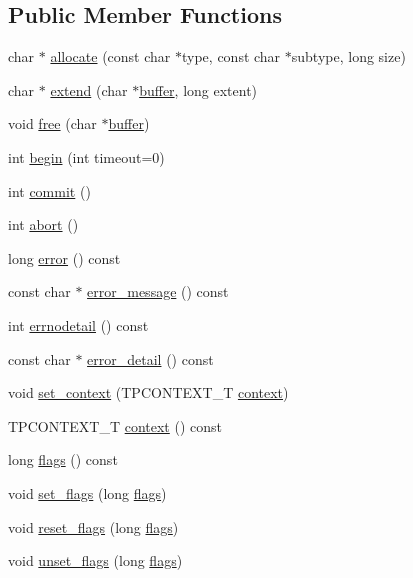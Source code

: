 \subsection*{Public Member Functions}
\begin{DoxyCompactItemize}
\item 
char $\ast$ \hyperlink{classatmi_1_1tuxedo_a44e77e3e6216a8c3fb8be33d5d8fed93}{allocate} (const char $\ast$type, const char $\ast$subtype, long size)
\item 
char $\ast$ \hyperlink{classatmi_1_1tuxedo_a683b79440474b94c471ed78ff3775eb8}{extend} (char $\ast$\hyperlink{classatmi_1_1buffer}{buffer}, long extent)
\item 
void \hyperlink{classatmi_1_1tuxedo_afdcf4b7d25862c6fdaeb47d095609a01}{free} (char $\ast$\hyperlink{classatmi_1_1buffer}{buffer})
\item 
int \hyperlink{classatmi_1_1tuxedo_ac702cf5e571a3302978bfa76cd314c9b}{begin} (int timeout=0)
\item 
int \hyperlink{classatmi_1_1tuxedo_aeff1d0270d6b12de07a4478839ec8b07}{commit} ()
\item 
int \hyperlink{classatmi_1_1tuxedo_ac5dbf9db596b4bfa05d0067b8a38e11c}{abort} ()
\item 
long \hyperlink{classatmi_1_1tuxedo_a2f5b4f52ca8095d704dcb23771425690}{error} () const 
\item 
const char $\ast$ \hyperlink{classatmi_1_1tuxedo_ad134373ac62fd2c7e1ac5482bdb7f65e}{error\+\_\+message} () const 
\item 
int \hyperlink{classatmi_1_1tuxedo_a77e2902dcd0293a2127a5d106e566a3b}{errnodetail} () const 
\item 
const char $\ast$ \hyperlink{classatmi_1_1tuxedo_ad7bf2370e3edeb091512d0b640093e9d}{error\+\_\+detail} () const 
\item 
void \hyperlink{classatmi_1_1tuxedo_afa3734356109e8c3ce4d23bfcb94242b}{set\+\_\+context} (T\+P\+C\+O\+N\+T\+E\+X\+T\+\_\+T \hyperlink{classatmi_1_1tuxedo_a6d31779e76609264295e0065fdfc008d}{context})
\item 
T\+P\+C\+O\+N\+T\+E\+X\+T\+\_\+T \hyperlink{classatmi_1_1tuxedo_a6d31779e76609264295e0065fdfc008d}{context} () const 
\item 
long \hyperlink{classatmi_1_1tuxedo_adfebbea0b6599ba8ca87743c55157b82}{flags} () const 
\item 
void \hyperlink{classatmi_1_1tuxedo_a31eb2881e3b9706c515da03728ab6875}{set\+\_\+flags} (long \hyperlink{classatmi_1_1tuxedo_adfebbea0b6599ba8ca87743c55157b82}{flags})
\item 
void \hyperlink{classatmi_1_1tuxedo_a649b28c90b5f73439e5d2ceb83a43dbd}{reset\+\_\+flags} (long \hyperlink{classatmi_1_1tuxedo_adfebbea0b6599ba8ca87743c55157b82}{flags})
\item 
void \hyperlink{classatmi_1_1tuxedo_aeef30e346c61643db72b255872729633}{unset\+\_\+flags} (long \hyperlink{classatmi_1_1tuxedo_adfebbea0b6599ba8ca87743c55157b82}{flags})
\end{DoxyCompactItemize}
